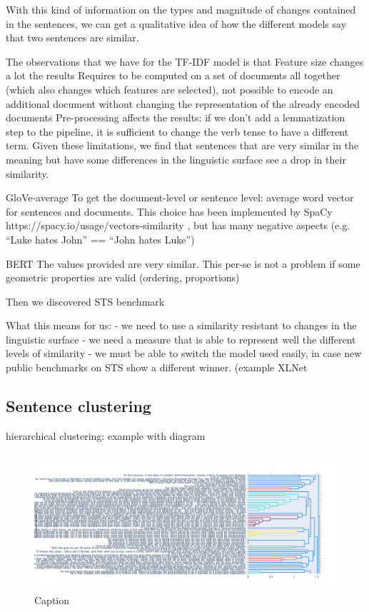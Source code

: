 With this kind of information on the types and magnitude of changes contained in the sentences, we can get a qualitative idea of how the different models say that two sentences are similar.


The observations that we have for the TF-IDF model is that
Feature size changes a lot the results
Requires to be computed on a set of documents all together (which also changes which features are selected), not possible to encode an additional document without changing the representation of the already encoded documents
Pre-processing affects the results: if we don’t add a lemmatization step to the pipeline, it is sufficient to change the verb tense to have a different term.
Given these limitations, we find that sentences that are very similar in the meaning but have some differences in the linguistic surface see a drop in their similarity.

GloVe-average
To get the document-level or sentence level: average word vector for sentences and documents. This choice has been implemented by SpaCy https://spacy.io/usage/vectors-similarity , but has many negative aspects (e.g. “Luke hates John” == “John hates Luke”) 

BERT
The values provided are very similar. This per-se is not a problem if some geometric properties are valid (ordering, proportions)


Then we discovered STS benchmark

What this means for us:
- we need to use a similarity resistant to changes in the linguistic surface
- we need a measure that is able to represent well the different levels of similarity
- we must be able to switch the model used easily, in case new public benchmarks on STS show a different winner. (example XLNet~\cite{yang2019xlnet}


\subsection{Sentence clustering}
hierarchical clustering: example with diagram
\begin{figure}
    \centering
    \includegraphics{figures/dendrogram.png}
    \caption{Caption}
    \label{fig:my_label}
\end{figure}

